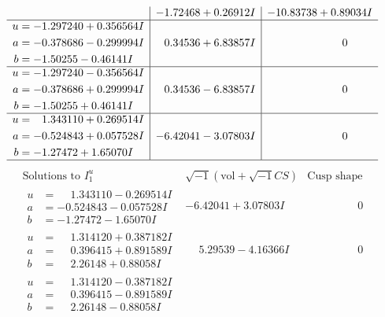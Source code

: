 \documentclass[1p]{elsarticle_modified}
\theoremstyle{definition}
\newcommand{\I}{\sqrt{-1}}
\begin{document}
$$\begin{array}{c|c|c}
 & -1.72468 + 0.26912 I & -10.83738 + 0.89034 I \\ \hline\begin{aligned}
u &= -1.297240 + 0.356564 I \\
a &= -0.378686 - 0.299994 I \\
b &= -1.50255 - 0.46141 I\end{aligned}
 & \phantom{-}0.34536 + 6.83857 I & \phantom{-0.000000 } 0 \\ \hline\begin{aligned}
u &= -1.297240 - 0.356564 I \\
a &= -0.378686 + 0.299994 I \\
b &= -1.50255 + 0.46141 I\end{aligned}
 & \phantom{-}0.34536 - 6.83857 I & \phantom{-0.000000 } 0 \\ \hline\begin{aligned}
u &= \phantom{-}1.343110 + 0.269514 I \\
a &= -0.524843 + 0.057528 I \\
b &= -1.27472 + 1.65070 I\end{aligned}
 & -6.42041 - 3.07803 I & \phantom{-0.000000 } 0\\
 \hline 
 \end{array}$$\newpage$$\begin{array}{c|c|c}  
\text{Solutions to }I^u_{1}& \I (\text{vol} + \sqrt{-1}CS) & \text{Cusp shape}\\
 \hline 
\begin{aligned}
u &= \phantom{-}1.343110 - 0.269514 I \\
a &= -0.524843 - 0.057528 I \\
b &= -1.27472 - 1.65070 I\end{aligned}
 & -6.42041 + 3.07803 I & \phantom{-0.000000 } 0 \\ \hline\begin{aligned}
u &= \phantom{-}1.314120 + 0.387182 I \\
a &= \phantom{-}0.396415 + 0.891589 I \\
b &= \phantom{-}2.26148 + 0.88058 I\end{aligned}
 & \phantom{-}5.29539 - 4.16366 I & \phantom{-0.000000 } 0 \\ \hline\begin{aligned}
u &= \phantom{-}1.314120 - 0.387182 I \\
a &= \phantom{-}0.396415 - 0.891589 I \\
b &= \phantom{-}2.26148 - 0.88058 I\end{aligned}

\end{array}$$
\end{document}
